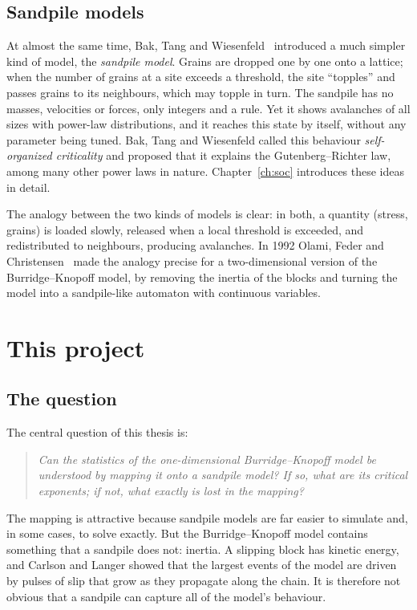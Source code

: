 \subsection{Sandpile models}

At almost the same time, Bak, Tang and Wiesenfeld~\cite{BTW1987,BTW1988} introduced a much simpler kind of
model, the \emph{sandpile model}. Grains are dropped one by one onto a lattice; when the number of grains
at a site exceeds a threshold, the site ``topples'' and passes grains to its neighbours, which may topple
in turn. The sandpile has no masses, velocities or forces, only integers and a rule. Yet it shows avalanches
of all sizes with power-law distributions, and it reaches this state by itself, without any parameter
being tuned. Bak, Tang and Wiesenfeld called this behaviour \emph{self-organized criticality} and proposed
that it explains the Gutenberg--Richter law, among many other power laws in nature. Chapter~\ref{ch:soc}
introduces these ideas in detail.

The analogy between the two kinds of models is clear: in both, a quantity (stress, grains) is loaded slowly,
released when a local threshold is exceeded, and redistributed to neighbours, producing avalanches. In 1992
Olami, Feder and Christensen~\cite{OFC1992} made the analogy precise for a two-dimensional version of the
Burridge--Knopoff model, by removing the inertia of the blocks and turning the model into a sandpile-like
automaton with continuous variables.

\section{This project}
\label{sec:project}

\subsection{The question}

The central question of this thesis is:
\begin{quote}
\emph{Can the statistics of the one-dimensional Burridge--Knopoff model be understood by mapping it onto a
sandpile model? If so, what are its critical exponents; if not, what exactly is lost in the mapping?}
\end{quote}
The mapping is attractive because sandpile models are far easier to simulate and, in some cases, to solve
exactly. But the Burridge--Knopoff model contains something that a sandpile does not: inertia. A slipping
block has kinetic energy, and Carlson and Langer showed that the largest events of the model are driven by
pulses of slip that grow as they propagate along the chain. It is therefore not obvious that a sandpile
can capture all of the model's behaviour.

